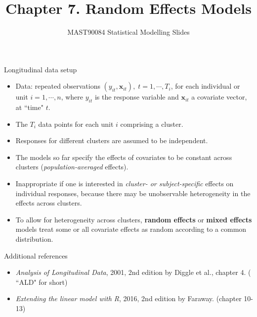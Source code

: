 \documentclass{beamer}
\title[\currentsection]{Chapter 7. Random Effects Models}
\author[Random Effects Models]{MAST90084 Statistical Modelling Slides}
\institute[Ch7]{Dennis Leung \\ \vskip 0.3cm SCHOOL OF MATHEMATICS AND STATISTICS\\
\vskip 0.3cm
   THE UNIVERSITY OF MELBOURNE}
\date[Dennis Leung \hspace{8pt}]{}
\newenvironment{wideitemize}%
  {\begin{itemize}%
    \setlength{\parskip}{1em}}%
  {\end{itemize}}
\begin{document}
\frame{\titlepage}
\begin{frame}{Longitudinal data setup}
\begin{wideitemize}

\item
Data: repeated observations $(y_{it}, \mathbf{x}_{it}), \; t=1,\cdots, T_i$, for each
individual or unit $i=1,\cdots, n$, where $y_{it}$ is the response variable and $\mathbf{x}_{it}$ a covariate
vector, at ``time" $t$.  
\item
 The $T_i$ data points for each unit $i$ comprising a cluster. 
\item
Responses for different clusters are 
assumed to be  independent.

\end{wideitemize}
\end{frame}


\begin{frame}{}
\begin{wideitemize}
\item
The models so far specify the effects of covariates  to be constant across 
clusters (\emph{population-averaged} effects). 


\item Inappropriate if one is interested
in \emph{cluster- or subject-specific} effects on individual responses, because there may be unobservable heterogeneity in the effects
across clusters.


\item To allow for heterogeneity across clusters, \textbf{random effects} or \textbf{mixed effects} models  treat some or all covariate effects as random according to a common distribution.

\end{wideitemize}
\end{frame}




\begin{frame}{Additional references}

\begin{wideitemize}
\item \emph{Analysis of Longitudinal Data}, 2001, 2nd edition by Diggle et al., chapter 4. ( ``ALD" for short)


\item \emph{Extending the linear model with R}, 2016, 2nd edition by Faraway. (chapter 10-13)

\end{wideitemize}


\end{frame}
\end{document}
